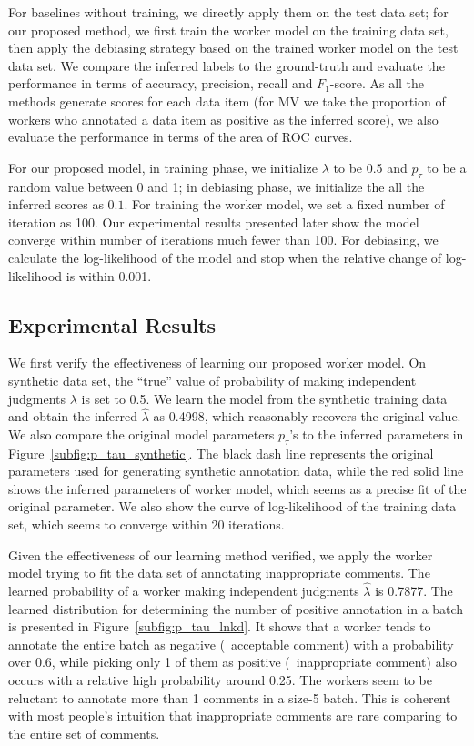 For baselines without training, we directly apply them on the test data set; 
for our proposed method, we first train the worker model on the training data set, 
then apply the debiasing strategy based on the trained worker model on the test data set.  
We compare the inferred labels to the ground-truth and evaluate the performance in terms of accuracy, precision, recall and $F_1$-score.  
As all the methods generate scores for each data item 
(for MV we take the proportion of workers who annotated a data item as positive as the inferred score),
we also evaluate the performance in terms of the area of ROC curves.  


For our proposed model, 
in training phase, we initialize $\lambda$ to be 0.5 and $p_{\tau}$ to be a random value between 0 and 1;
in debiasing phase, we initialize the all the inferred scores as $0.1$. 
For training the worker model, we set a fixed number of iteration as 100.  
Our experimental results presented later show the model converge within number of iterations much fewer than 100.  
For debiasing, we calculate the log-likelihood of the model and stop when the relative change of log-likelihood is within 0.001.  


\subsection{Experimental Results}


We first verify the effectiveness of learning our proposed worker model.  
On synthetic data set, the ``true'' value of probability of making independent judgments $\lambda$ is set to 0.5.  
We learn the model from the synthetic training data and obtain the inferred $\hat{\lambda}$ as 0.4998, 
which reasonably recovers the original value.  
We also compare the original model parameters $p_{\tau}$'s to the inferred parameters in Figure~\ref{subfig:p_tau_synthetic}.  
The black dash line represents the original parameters used for generating synthetic annotation data, 
while the red solid line shows the inferred parameters of worker model, 
which seems as a precise fit of the original parameter.  
We also show the curve of log-likelihood of the training data set,
which seems to converge within 20 iterations.  

Given the effectiveness of our learning method verified, 
we apply the worker model trying to fit the data set of annotating inappropriate comments.  
The learned probability of a worker making independent judgments $\hat{\lambda}$ is 0.7877.  
The learned distribution for determining the number of positive annotation in a batch is presented in Figure~\ref{subfig:p_tau_lnkd}.  
It shows that a worker tends to annotate the entire batch as negative (\ie~acceptable comment) with a probability over 0.6, 
while picking only 1 of them as positive (\ie~inappropriate comment) also occurs with a relative high probability around 0.25.  
The workers seem to be reluctant to annotate more than 1 comments in a size-5 batch.  
This is coherent with most people's intuition that inappropriate comments are rare comparing to the entire set of comments.  

